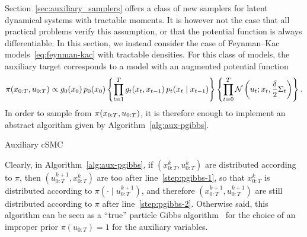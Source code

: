 Section~\ref{sec:auxiliary_samplers} offers a class of new samplers for latent dynamical systems with tractable moments. It is however not the case that all practical problems verify this assumption, or that the potential function is always differentiable.
In this section, we instead consider the case of Feynman--Kac models~\eqref{eq:feynman-kac} with tractable densities.
For this class of models, the auxiliary target corresponds to a model with an augmented potential function
\begin{equation}
    \label{eq:auxiliary-feynman-kac}
    \pi(x_{0:T}, u_{0:T})
    \propto g_0(x_0) \, p_0(x_0) \left\{\prod_{t=1}^T g_t(x_t, x_{t-1}) \, p_t(x_t \mid x_{t-1}) \right\}\left\{\prod_{t=0}^T \mathcal{N}\left(u_t; x_t, \frac{\delta}{2} \Sigma_t\right)\right\}.
\end{equation}
In order to sample from $\pi(x_{0:T}, u_{0:T})$, it is therefore enough to implement an abstract algorithm given by Algorithm~\ref{alg:aux-pgibbs}.

\begin{algorithm}[!htb]
    \SetAlgoLined
    \DontPrintSemicolon
    \caption{Auxiliary cSMC}\label{alg:aux-pgibbs}
\end{algorithm}

Clearly, in Algorithm~\ref{alg:aux-pgibbs}, if $(x^k_{0:T}, u^k_{0:T})$ are distributed according to $\pi$, then $(u^{k+1}_{0:T}, x^k_{0:T})$ are too after line~\ref{step:pgibbs-1}, so that $x^k_{0:T}$ is distributed according to $\pi(\cdot \mid u^{k+1}_{0:T})$, and therefore $(x^{k+1}_{0:T}, u^{k+1}_{0:T})$ are still distributed according to $\pi$ after line~\ref{step:pgibbs-2}. Otherwise said, this algorithm can be seen as a ``true'' particle Gibbs algorithm~\citep{Andrieu2010particle} for the choice of an improper prior $\pi(u_{0:T}) = 1$ for the auxiliary variables.


